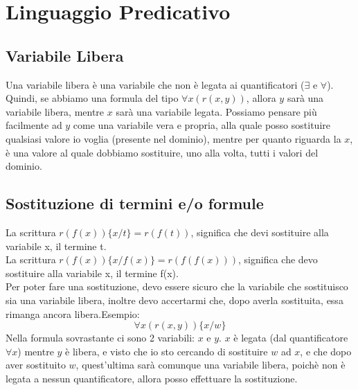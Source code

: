 \documentclass[11pt]{article}
\begin{document}
\section{Linguaggio Predicativo}
\subsection{Variabile Libera}
Una variabile libera è una variabile che non è legata ai quantificatori ($\exists$ e $\forall$).\\
Quindi, se abbiamo una formula del tipo $\forall x(r(x, y))$, allora $y$ sarà una variabile libera, mentre $x$ sarà una variabile legata.
Possiamo pensare più facilmente ad $y$ come una variabile vera e propria, alla quale posso sostituire qualsiasi valore io voglia (presente nel dominio), mentre
per quanto riguarda la $x$, è una valore al quale dobbiamo sostituire, uno alla volta, tutti i valori del dominio.
\subsection{Sostituzione di termini e/o formule}
La scrittura $r(f(x)) \{x/t\} = r(f(t))$, significa che devi sostituire alla variabile x, il termine t.\\
La scrittura $r(f(x)) \{x/f(x)\} = r(f(f(x)))$, significa che devo sostituire alla variabile x, il termine f(x).\\
Per poter fare una sostituzione, devo essere sicuro che la variabile che sostituisco sia una variabile libera, 
inoltre devo accertarmi che, dopo averla sostituita, essa rimanga ancora libera.Esempio:
$$\forall x(r(x,y)) \{x/w\}$$
Nella formula sovrastante ci sono 2 variabili: $x$ e $y$. $x$ è legata (dal quantificatore $\forall x$) mentre $y$ è libera, e visto 
che io sto cercando di sostituire $w$ ad $x$, e che dopo aver sostituito $w$, quest'ultima sarà comunque una variabile libera, poichè 
non è legata a nessun quantificatore, allora posso effettuare la sostituzione.
\end{document}
